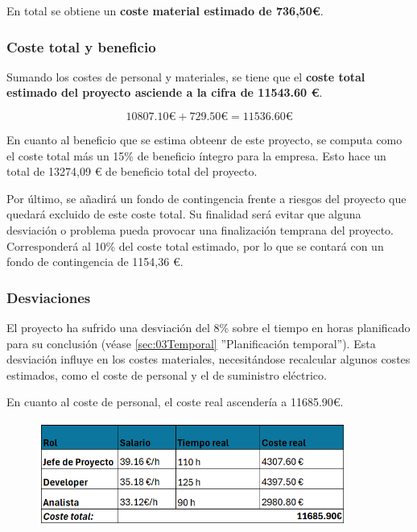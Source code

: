 En total se obtiene un \textbf{coste material estimado de 736,50€}.

\subsubsection{Coste total y beneficio}

Sumando los costes de personal y materiales, se tiene que el \textbf{coste total estimado del proyecto asciende a la cifra de 11543.60 €}.

\begin{equation}
    10807.10\text{€} + 729.50\text{€} =  11536.60 \text{€}
\end{equation}

En cuanto al beneficio que se estima obteenr de este proyecto, se computa como el coste total más un 15\% de beneficio íntegro para la empresa. Esto hace un total de 13274,09 € de beneficio total del proyecto.

Por último, se añadirá un fondo de contingencia frente a riesgos del proyecto que quedará excluido de este coste total. Su finalidad será evitar que alguna desviación o problema pueda provocar una finalización temprana del proyecto. Corresponderá al 10\% del coste total estimado, por lo que se contará con un fondo de contingencia de 1154,36 €.

\subsubsection{Desviaciones}

El proyecto ha sufrido una desviación del 8\% sobre el tiempo en horas planificado para su conclusión (véase \ref{sec:03Temporal} ''Planificación temporal''). Esta desviación influye en los costes materiales, necesitándose recalcular algunos costes estimados, como el coste de personal y el de suministro eléctrico. 

En cuanto al coste de personal, el coste real ascendería a 11685.90€.%

\begin{figure}[H]
    \centering
    \includegraphics[width=0.90\textwidth]{tables/costeRealcap.png}
    \label{table:costeRealcap}
\end{figure}

